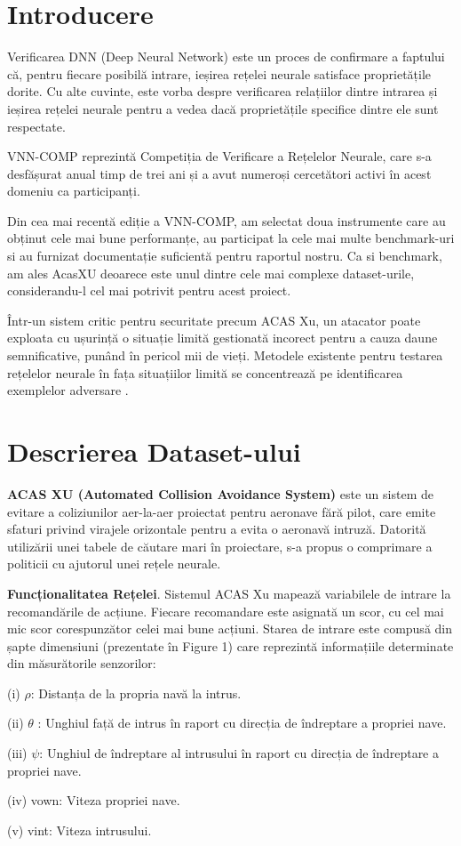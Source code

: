 \documentclass[12pt,a4paper]{article}
\theoremstyle{definition}
\theoremstyle{remark}
\begin{document}
\newpage
\section{Introducere}
Verificarea DNN (Deep Neural Network) este un proces de confirmare a faptului că, pentru fiecare posibilă intrare, ieșirea rețelei neurale satisface proprietățile dorite. Cu alte cuvinte, este vorba despre verificarea relațiilor dintre intrarea și ieșirea rețelei neurale pentru a vedea dacă proprietățile specifice dintre ele sunt respectate.\par
VNN-COMP reprezintă Competiția de Verificare a Rețelelor Neurale, care s-a desfășurat anual timp de trei ani și a avut numeroși cercetători activi în acest domeniu ca participanți.\par
Din cea mai recentă ediție a VNN-COMP, am selectat doua instrumente care au obținut cele mai bune performanțe, au participat la cele mai multe benchmark-uri si au furnizat documentație suficientă pentru raportul nostru. Ca si benchmark, am ales AcasXU deoarece este unul dintre cele mai complexe dataset-urile, considerandu-l cel mai potrivit pentru acest proiect.\par
Într-un sistem critic pentru securitate precum ACAS Xu, un atacator poate exploata cu ușurință o situație limită gestionată incorect pentru a cauza daune semnificative, punând în pericol mii de vieți. Metodele existente pentru testarea rețelelor neurale în fața situațiilor limită se concentrează pe identificarea exemplelor adversare \cite{reluplex}. \par
\section{Descrierea Dataset-ului}
{\bf ACAS XU\cite{introduction} (Automated Collision Avoidance System)} este un sistem de evitare a coliziunilor aer-la-aer proiectat pentru aeronave fără pilot, care emite sfaturi privind virajele orizontale pentru a evita o aeronavă intruză. Datorită utilizării unei tabele de căutare mari în proiectare, s-a propus o comprimare a politicii cu ajutorul unei rețele neurale. \par
{\bf Funcționalitatea Rețelei}. Sistemul ACAS Xu mapează variabilele de intrare la recomandările de acțiune. Fiecare recomandare este asignată un scor, cu cel mai mic scor corespunzător celei mai bune acțiuni. Starea de intrare este compusă din șapte dimensiuni (prezentate în Figure 1) care reprezintă informațiile determinate din măsurătorile senzorilor: \par
(i) $\rho$: Distanța de la propria navă la intrus. \par
(ii) $\theta$ : Unghiul față de intrus în raport cu direcția de îndreptare a propriei nave. \par
(iii) $\psi$: Unghiul de îndreptare al intrusului în raport cu direcția de îndreptare a propriei nave. \par
(iv) vown: Viteza propriei nave. \par
(v) vint: Viteza intrusului. \par
\end{document}
